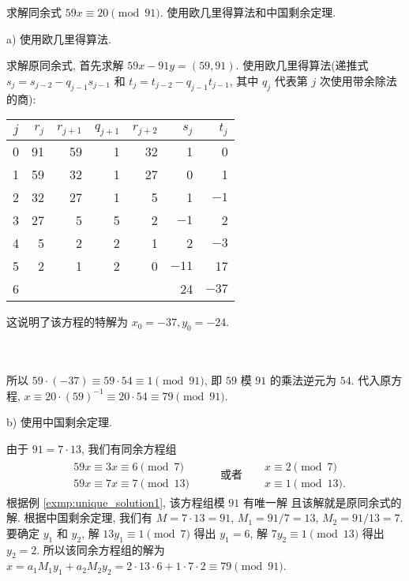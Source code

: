 \documentclass[a5paper,fleqn,10pt]{article}
\begin{document}
\begin{exmp}
	求解同余式 $59x\equiv 20\pmod{91}$. 使用欧几里得算法和中国剩余定理.
\end{exmp}
\begin{solution}
	a) 使用欧几里得算法.

	求解原同余式, 首先求解 $59x-91y=(59,91)$. 使用欧几里得算法(递推式 $s_j=s_{j-2}-q_{j-1}s_{j-1}$
	和 $t_j=t_{j-2}-q_{j-1}t_{j-1}$, 其中 $q_j$ 代表第 $j$ 次使用带余除法的商):

	\begin{minipage}{0.6\linewidth}%
		\begin{tabular}{c|rrrrrr}
			$j$ & $r_j$ & $r_{j+1}$ & $q_{j+1}$ & $r_{j+2}$ & $s_j$ & $t_j$ \\
			\hline
			0   & 91    & 59        & 1         & 32        & 1     & 0     \\
			1   & 59    & 32        & 1         & 27        & 0     & 1     \\
			2   & 32    & 27        & 1         & 5         & 1     & $-1$  \\
			3   & 27    & 5         & 5         & 2         & $-1$  & 2     \\
			4   & 5     & 2         & 2         & 1         & 2     & $-3$  \\
			5   & 2     & 1         & 2         & 0         & $-11$ & 17    \\
			6   &       &           &           &           & 24    & $-37$
		\end{tabular}%
	\end{minipage}
	\parbox{0.3\linewidth}{这说明了该方程的特解为 $x_0=-37,y_0=-24$.}
	\\\\
	所以 $59\cdot(-37)\equiv 59\cdot 54\equiv 1\pmod{91}$, 即 $59$ 模 $91$ 的乘法逆元为 $54$.
	代入原方程, $x\equiv 20\cdot(59)^{-1}\equiv 20\cdot 54\equiv 79\pmod{91}$.

	b) 使用中国剩余定理.

	由于 $91=7\cdot 13$, 我们有同余方程组
	\begin{align*}
		\begin{aligned}
			 & 59x\equiv 3x\equiv 6\pmod 7   \\
			 & 59x\equiv 7x\equiv 7\pmod{13}
		\end{aligned} &  &  & \text{或者} &
		\begin{aligned}
			 & x\equiv 2\pmod 7   \\
			 & x\equiv 1\pmod{13}.
		\end{aligned}
	\end{align*}
	根据例 \ref{exmp:unique_solution1}, 该方程组模 $91$ 有唯一解 且该解就是原同余式的解. 根据中国剩余定理, 我们有 $M=7\cdot 13=91$, $M_1=91/7=13$,
	$M_2=91/13=7$. 要确定 $y_1$ 和 $y_2$, 解 $13y_1\equiv 1\pmod 7$ 得出 $y_1=6$, 解 $7y_2\equiv 1\pmod{13}$ 得出 $y_2=2$.
	所以该同余方程组的解为 $x=a_1M_1y_1+a_2M_2y_2=2\cdot 13\cdot 6+1\cdot 7\cdot 2\equiv 79\pmod{91}$.
\end{solution}
\end{document}
